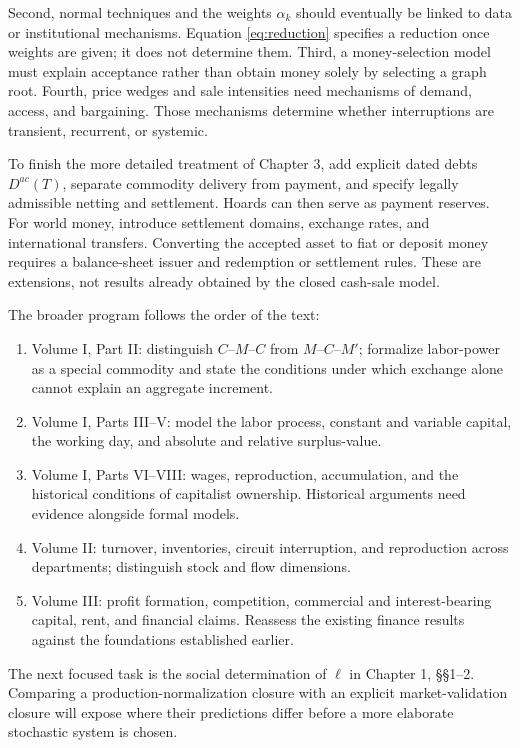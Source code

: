 \documentclass[11pt,letterpaper]{article}
\begin{document}
Second, normal techniques and the weights $\alpha_k$ should eventually
be linked to data or institutional mechanisms. Equation
\eqref{eq:reduction} specifies a reduction once weights are given; it
does not determine them. Third, a money-selection model must explain
acceptance rather than obtain money solely by selecting a graph root.
Fourth, price wedges and sale intensities need mechanisms of demand,
access, and bargaining. Those mechanisms determine whether interruptions
are transient, recurrent, or systemic.

To finish the more detailed treatment of Chapter 3, add explicit dated
debts $D^{ac}(T)$, separate commodity delivery from payment, and specify
legally admissible netting and settlement. Hoards can then serve as
payment reserves. For world money, introduce settlement domains,
exchange rates, and international transfers. Converting the accepted
asset to fiat or deposit money requires a balance-sheet issuer and
redemption or settlement rules. These are extensions, not results
already obtained by the closed cash-sale model.

The broader program follows the order of the text:
\begin{enumerate}
\item Volume I, Part II: distinguish $C$--$M$--$C$ from $M$--$C$--$M'$;
formalize labor-power as a special commodity and state the conditions
under which exchange alone cannot explain an aggregate increment.
\item Volume I, Parts III--V: model the labor process, constant and
variable capital, the working day, and absolute and relative surplus-value.
\item Volume I, Parts VI--VIII: wages, reproduction, accumulation, and
the historical conditions of capitalist ownership. Historical arguments
need evidence alongside formal models.
\item Volume II: turnover, inventories, circuit interruption, and
reproduction across departments; distinguish stock and flow dimensions.
\item Volume III: profit formation, competition, commercial and
interest-bearing capital, rent, and financial claims. Reassess the
existing finance results against the foundations established earlier.
\end{enumerate}
The next focused task is the social determination of $\ell$ in Chapter 1,
§§1--2. Comparing a production-normalization closure with an explicit
market-validation closure will expose where their predictions differ
before a more elaborate stochastic system is chosen.
\end{document}
